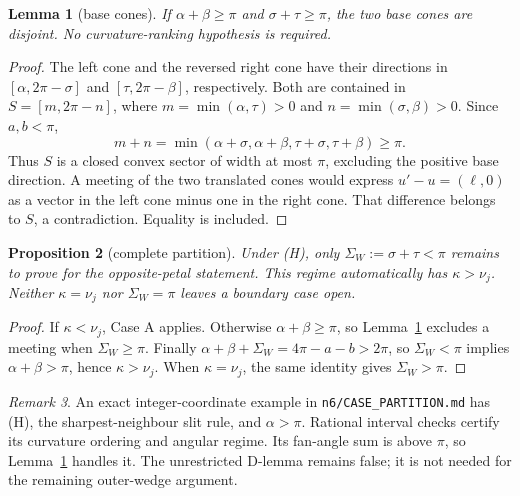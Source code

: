 \documentclass[11pt]{article}
\newtheorem{lemma}{Lemma}
\newtheorem{proposition}[lemma]{Proposition}
\theoremstyle{definition}
\theoremstyle{remark}
\newtheorem{remark}[lemma]{Remark}
\begin{document}
\begin{lemma}[base cones]\label{basecones}
If $\alpha+\beta\ge\pi$ and $\sigma+\tau\ge\pi$, the two base cones are
disjoint. No curvature-ranking hypothesis is required.
\end{lemma}
\begin{proof}
The left cone and the reversed right cone have their directions in
$[\alpha,2\pi-\sigma]$ and $[\tau,2\pi-\beta]$, respectively. Both are
contained in $S=[m,2\pi-n]$, where
$m=\min(\alpha,\tau)>0$ and $n=\min(\sigma,\beta)>0$. Since $a,b<\pi$,
\[
 m+n=\min(\alpha+\sigma,\alpha+\beta,\tau+\sigma,\tau+\beta)\ge\pi.
\]
Thus $S$ is a closed convex sector of width at most $\pi$, excluding the
positive base direction. A meeting of the two translated cones would express
$u'-u=(\ell,0)$ as a vector in the left cone minus one in the right cone.
That difference belongs to $S$, a contradiction. Equality is included.
\end{proof}

\begin{proposition}[complete partition]\label{partition}
Under (H), only $\Sigma_W:=\sigma+\tau<\pi$ remains to prove for the
opposite-petal statement. This regime automatically has $\kappa>\nu_j$.
Neither $\kappa=\nu_j$ nor $\Sigma_W=\pi$ leaves a boundary case open.
\end{proposition}
\begin{proof}
If $\kappa<\nu_j$, Case A applies. Otherwise $\alpha+\beta\ge\pi$, so
Lemma~\ref{basecones} excludes a meeting when $\Sigma_W\ge\pi$.
Finally $\alpha+\beta+\Sigma_W=4\pi-a-b>2\pi$, so
$\Sigma_W<\pi$ implies $\alpha+\beta>\pi$, hence $\kappa>\nu_j$.
When $\kappa=\nu_j$, the same identity gives $\Sigma_W>\pi$.
\end{proof}

\begin{remark}
An exact integer-coordinate example in \texttt{n6/CASE\_PARTITION.md} has
(H), the sharpest-neighbour slit rule, and $\alpha>\pi$. Rational interval
checks certify its curvature ordering and angular regime. Its fan-angle sum
is above $\pi$, so Lemma~\ref{basecones} handles it. The unrestricted D-lemma
remains false; it is not needed for the remaining outer-wedge argument.
\end{remark}
\end{document}
